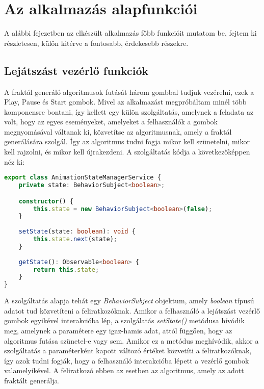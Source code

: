 \chapter*{Az alkalmazás alapfunkciói}
A alábbi fejezetben az elkészült alkalmazás főbb funkcióit mutatom be, fejtem ki részletesen, külön kitérve a fontosabb, érdekesebb részekre.
\section*{Lejátszást vezérlő funkciók}
A fraktál generáló algoritmusok futását három gombbal tudjuk vezérelni, ezek a Play, Pause és Start gombok. Mivel az alkalmazást megpróbáltam minél több komponensre bontani, így kellett egy külön szolgáltatás, amelynek a feladata az volt, hogy az egyes eseményeket, amelyeket a felhasználók a gombok megnyomásával váltanak ki, közvetítse az algoritmusnak, amely a fraktál generálására szolgál. Így az algoritmus tudni fogja mikor kell szünetelni, mikor kell rajzolni, és mikor kell újrakezdeni. A szolgáltatás kódja a következőképpen néz ki:
\begin{lstlisting}[language=typescript]
export class AnimationStateManagerService {
	private state: BehaviorSubject<boolean>;

	constructor() {
		this.state = new BehaviorSubject<boolean>(false);
	}
	
	setState(state: boolean): void {
		this.state.next(state);
	}
	
	getState(): Observable<boolean> {
		return this.state;
	}
}
\end{lstlisting}
A szolgáltatás alapja tehát egy {\it BehaviorSubject} objektum, amely {\it boolean} típusú adatot tud közvetíteni a feliratkozóknak. Amikor a felhasználó a lejátszást vezérlő gombok egyikével interakcióba lép, a szolgálatás {\it setState()} metódusa hívódik meg, amelynek a paramétere egy igaz-hamis adat, attól függően, hogy az algoritmus futása szünetel-e vagy sem. Amikor ez a metódus meghívódik, akkor a szolgáltatás a paraméterként kapott változó értéket közvetíti a feliratkozóknak, így azok tudni fogják, hogy a felhasználó interakcióba lépett a vezérlő gombok valamelyikével. A feliratkozó ebben az esetben az algoritmus, amely az adott fraktált generálja.  
